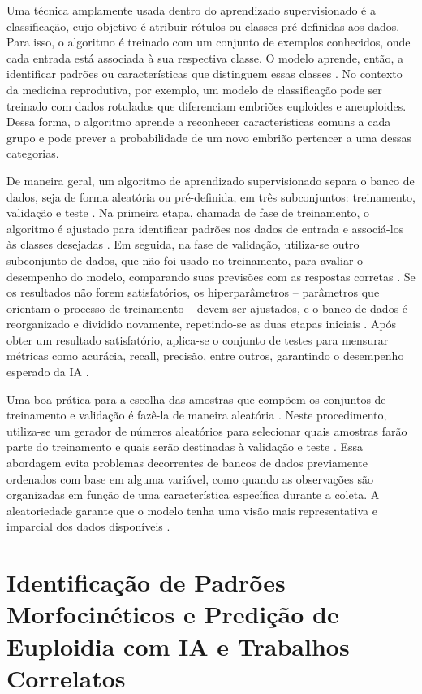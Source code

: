 Uma técnica amplamente usada dentro do aprendizado supervisionado é a classificação, cujo objetivo é atribuir rótulos ou classes pré-definidas aos dados. Para isso, o algoritmo é treinado com um conjunto de exemplos conhecidos, onde cada entrada está associada à sua respectiva classe. O modelo aprende, então, a identificar padrões ou características que distinguem essas classes \cite{izbicki2020}. No contexto da medicina reprodutiva, por exemplo, um modelo de classificação pode ser treinado com dados rotulados que diferenciam embriões euploides e aneuploides. Dessa forma, o algoritmo aprende a reconhecer características comuns a cada grupo e pode prever a probabilidade de um novo embrião pertencer a uma dessas categorias.

De maneira geral, um algoritmo de aprendizado supervisionado separa o banco de dados, seja de forma aleatória ou pré-definida, em três subconjuntos: treinamento, validação e teste \cite{izbicki2020}. Na primeira etapa, chamada de fase de treinamento, o algoritmo é ajustado para identificar padrões nos dados de entrada e associá-los às classes desejadas \cite{izbicki2020}. Em seguida, na fase de validação, utiliza-se outro subconjunto de dados, que não foi usado no treinamento, para avaliar o desempenho do modelo, comparando suas previsões com as respostas corretas \cite{izbicki2020}. Se os resultados não forem satisfatórios, os hiperparâmetros – parâmetros que orientam o processo de treinamento – devem ser ajustados, e o banco de dados é reorganizado e dividido novamente, repetindo-se as duas etapas iniciais \cite{izbicki2020}. Após obter um resultado satisfatório, aplica-se o conjunto de testes para mensurar métricas como acurácia, recall, precisão, entre outros, garantindo o desempenho esperado da IA \cite{izbicki2020}.

Uma boa prática para a escolha das amostras que compõem os conjuntos de treinamento e validação é fazê-la de maneira aleatória \cite{izbicki2020}. Neste procedimento, utiliza-se um gerador de números aleatórios para selecionar quais amostras farão parte do treinamento e quais serão destinadas à validação e teste \cite{izbicki2020}. Essa abordagem evita problemas decorrentes de bancos de dados previamente ordenados com base em alguma variável, como quando as observações são organizadas em função de uma característica específica durante a coleta. A aleatoriedade garante que o modelo tenha uma visão mais representativa e imparcial dos dados disponíveis \cite{izbicki2020}.

\section{Identificação de Padrões Morfocinéticos e Predição de Euploidia com IA e Trabalhos Correlatos}

